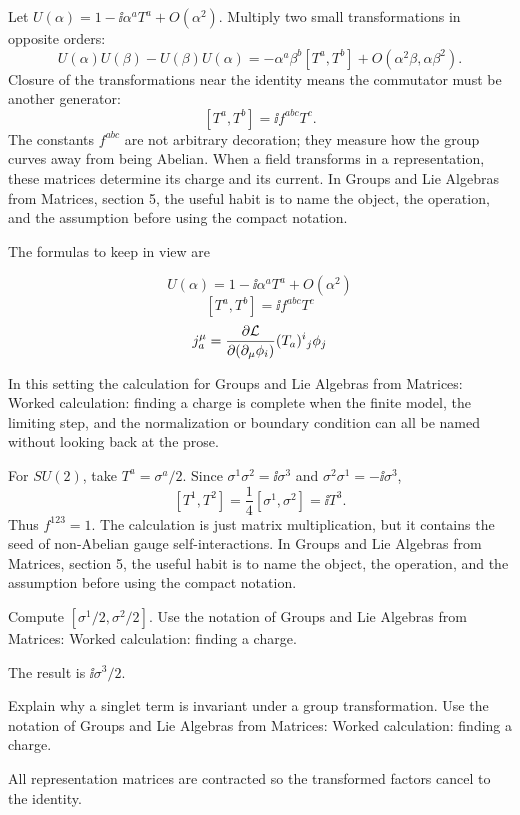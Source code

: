 Let \(U(\alpha)=1-\ii\alpha^aT^a+O(\alpha^2)\).  Multiply two small transformations in opposite orders:
\[
  U(\alpha)U(\beta)-U(\beta)U(\alpha)
  =
  -\alpha^a\beta^b[T^a,T^b]+O(\alpha^2\beta,\alpha\beta^2).
\]
Closure of the transformations near the identity means the commutator must be another generator:
\[
  [T^a,T^b]=\ii f^{abc}T^c.
\]
The constants \(f^{abc}\) are not arbitrary decoration; they measure how the group curves away from being Abelian.  When a field transforms in a representation, these matrices determine its charge and its current.  In Groups and Lie Algebras from Matrices, section 5, the useful habit is to name the object, the operation, and the assumption before using the compact notation.

The formulas to keep in view are

\[
  U(\alpha)=1-\ii\alpha^aT^a+O(\alpha^2)
\]
\[
  [T^a,T^b]=\ii f^{abc}T^c
\]
\[
  j^\mu_a=\frac{\partial\mathcal L}{\partial(\partial_\mu\phi_i)}(T_a)^i{}_j\phi_j
\]

In this setting the calculation for Groups and Lie Algebras from Matrices: Worked calculation: finding a charge is complete when the finite model, the limiting step, and the normalization or boundary condition can all be named without looking back at the prose.




\begin{example}
For \(SU(2)\), take \(T^a=\sigma^a/2\).  Since \(\sigma^1\sigma^2=\ii\sigma^3\) and \(\sigma^2\sigma^1=-\ii\sigma^3\),
\[
  [T^1,T^2]=\frac14[\sigma^1,\sigma^2]=\ii T^3.
\]
Thus \(f^{123}=1\).  The calculation is just matrix multiplication, but it contains the seed of non-Abelian gauge self-interactions.  In Groups and Lie Algebras from Matrices, section 5, the useful habit is to name the object, the operation, and the assumption before using the compact notation.
\end{example}



\begin{exercise}
Compute \([\sigma^1/2,\sigma^2/2]\).  Use the notation of Groups and Lie Algebras from Matrices: Worked calculation: finding a charge.
\begin{answer}
The result is \(\ii\sigma^3/2\).
\end{answer}
\end{exercise}

\begin{exercise}
Explain why a singlet term is invariant under a group transformation.  Use the notation of Groups and Lie Algebras from Matrices: Worked calculation: finding a charge.
\begin{answer}
All representation matrices are contracted so the transformed factors cancel to the identity.
\end{answer}
\end{exercise}



